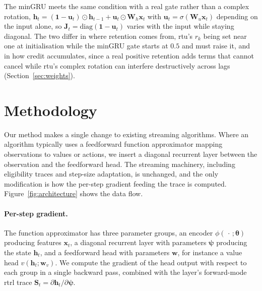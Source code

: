 \documentclass{article}
\begin{document}
The minGRU \citep{feng2024were} meets the same condition with a real gate rather than a
complex rotation, $\boldsymbol{h}_t = (\boldsymbol{1}-\boldsymbol{u}_t) \odot \boldsymbol{h}_{t-1}
+ \boldsymbol{u}_t \odot \boldsymbol{W}_h \boldsymbol{x}_t$ with
$\boldsymbol{u}_t = \sigma(\boldsymbol{W}_u \boldsymbol{x}_t)$ depending on the input alone, so
$\boldsymbol{J}_t = \mathrm{diag}(\boldsymbol{1}-\boldsymbol{u}_t)$ varies with the input while
staying diagonal. The two differ in where retention comes from, \gls{rtu}'s $r_k$
being set near one at initialisation while the minGRU gate starts at $0.5$ and must raise it,
and in how credit accumulates, since a real positive retention adds terms that cannot cancel
while \gls{rtu}'s complex rotation can interfere destructively across lags
(Section~\ref{sec:weights}).



\section{Methodology}
\label{sec:methodology}


Our method makes a single change to existing streaming algorithms.
Where an algorithm typically uses a feedforward function approximator
mapping observations to values or actions, we insert a diagonal recurrent layer between the observation and the feedforward head. The streaming machinery, including eligibility traces and step-size
adaptation, is unchanged, and the only modification is how the per-step gradient feeding the
trace is computed. Figure~\ref{fig:architecture} shows the data flow.



\paragraph{Per-step gradient.}
The function approximator has three parameter groups, an encoder
$\phi(\,\cdot\,;\boldsymbol{\theta})$ producing features $\boldsymbol{x}_t$, a diagonal recurrent
layer with parameters $\boldsymbol{\psi}$ producing the state
$\boldsymbol{h}_t$, and a feedforward head with parameters $\boldsymbol{w}$, for instance a
value head $v(\boldsymbol{h}_t; \boldsymbol{w}_v)$. We compute the gradient
of the head output with respect to each group in a single backward pass,
combined with the layer's forward-mode \gls{rtrl} trace
$\boldsymbol{S}_t = \partial \boldsymbol{h}_t / \partial \boldsymbol{\psi}$.
\end{document}
